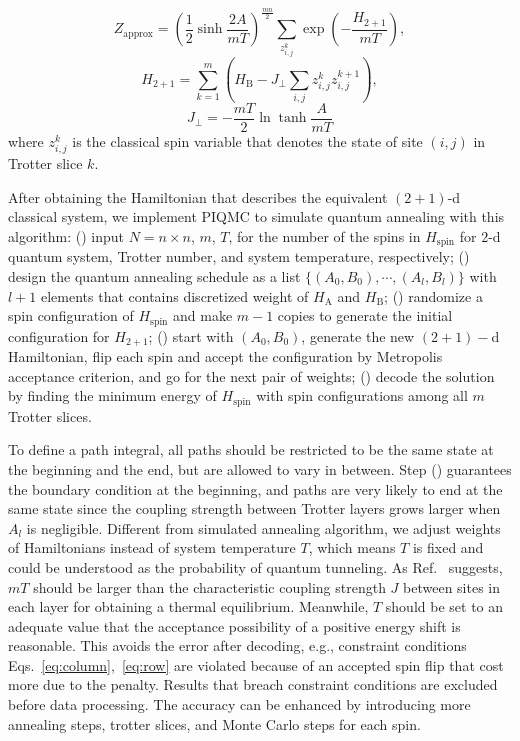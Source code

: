 \documentclass[aps,pra,twocolumn,superscriptaddress]{revtex4-2}
\begin{document}
\begin{equation}
Z_\text{approx}=(\frac{1}{2}\sinh\frac{2A}{mT})^{\frac{mn}{2}}\sum_{z_{i,j}^k}\exp(-\frac{H_{2+1}}{mT}),
\end{equation}
\begin{equation}
H_{2+1}=\sum_{k=1}^m(H_\text{B}-J_\bot\sum_{i,j}z_{i,j}^kz_{i,j}^{k+1}),
\end{equation}
\begin{equation}
J_\bot=-\frac{mT}{2}\ln\tanh\frac{A}{mT}
\end{equation}
where $z_{i,j}^k$ is the classical spin variable that denotes the state of site $(i,j)$ in Trotter slice $k$. 

After obtaining the Hamiltonian that describes the equivalent $(2+1)$-d classical system, we implement PIQMC to simulate quantum annealing with this algorithm: () input $N=n\times n$, $m$, $T$, for the number of the spins in $H_\text{spin}$ for $2$-d quantum system, Trotter number, and system temperature, respectively; () design the quantum annealing schedule as a list $\{(A_0,B_0),\cdots,(A_l,B_l)\}$ with $l+1$ elements that contains discretized weight of $H_\text{A}$ and $H_\text{B}$; () randomize a spin configuration of $H_\text{spin}$ and make $m-1$ copies to generate the initial configuration for $H_{2+1}$; () start with $(A_0,B_0)$, generate the new $(2+1)-$d Hamiltonian, flip each spin and accept the configuration by Metropolis acceptance criterion, and go for the next pair of weights; () decode the solution by finding the minimum energy of $H_\text{spin}$ with spin configurations among all $m$ Trotter slices. 

To define a path integral, all paths should be restricted to be the same state at the beginning and the end, but are allowed to vary in between. Step () guarantees the boundary condition at the beginning, and paths are very likely to end at the same state since the coupling strength between Trotter layers grows larger when $A_l$ is negligible. Different from simulated annealing algorithm, we adjust weights of Hamiltonians instead of system temperature $T$, which means $T$ is fixed and could be understood as the probability of quantum tunneling.  As Ref.~\cite{path_integral} suggests, $mT$ should be larger than the characteristic coupling strength $J$ between sites in each layer for obtaining a thermal equilibrium. Meanwhile, $T$ should be set to an adequate value that the acceptance possibility of a positive energy shift is reasonable. This avoids the error after decoding, e.g., constraint conditions Eqs.~\eqref{eq:column},~\eqref{eq:row} are violated because of an accepted spin flip that cost more due to the penalty. Results that breach constraint conditions are excluded before data processing. The accuracy can be enhanced by introducing more annealing steps, trotter slices, and Monte Carlo steps for each spin.
\end{document}
